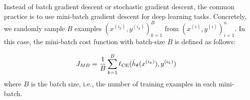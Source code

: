Instead of batch gradient descent or stochastic gradient descent, the common practice
is to use mini-batch gradient descent for deep learning tasks. Concretely, we randomly sample $B$ examples $(x^{(i_k)}, y^{(i_k)})_{k=1}^B$ from $(x^{(i)}, y^{(i)})_{i=1}^n$. In this case, the
mini-batch cost function with batch-size $B$ is defined as follows:

  \begin{equation*}
  J_{MB} = \frac{1}{B}\sum_{k=1}^B \ell_\textup{CE}(\bar{h}_{\theta}(x^{(i_k)}),y^{(i_k)})
  \end{equation*}
where $B$ is the batch size, i.e., the number of training examples in each mini-batch. 

\begin{enumerate}
  

\ifnum{} {
  
} \fi

  

\ifnum{} {
  
} \fi

  

\ifnum{} {
  
} \fi


  
\ifnum{} {
  
} \fi

 \end{enumerate}


